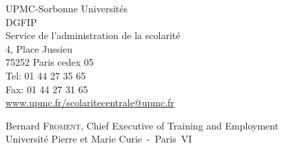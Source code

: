 \documentclass[a4paper,11pt,twoside]{article}
\begin{document}
\begin{flushleft}
UPMC-Sorbonne Universit\'es\\
DGFIP\\
Service de l'administration de la scolarit\'e\\
4, Place Jussieu\\
75252 Paris cedex 05\\
Tel: 01 44 27 35 65\\
Fax: 01 44 27 31 65\\
\url{www.upmc.fr/scolaritecentrale@upmc.fr}
\end{flushleft}
\begin{flushright}
[Signed by] Bernard \textsc{Froment}, Chief Executive of Training and
Employment\\
Universit\'e Pierre et Marie Curie~-~Paris~VI
\end{flushright}
\end{document}
